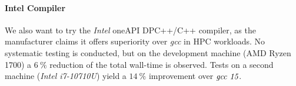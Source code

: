 	\paragraph{Intel Compiler}
		We also want to try the \emph{Intel\textsuperscript{\tiny\textregistered}} oneAPI DPC++/C++ compiler, as the manufacturer claims it offers superiority over \emph{gcc} in HPC workloads. No systematic testing is conducted, but on the development machine (AMD Ryzen 1700) a $\SI{6}{\percent}$ reduction of the total wall-time is observed. Tests on a second machine (\emph{Intel\textsuperscript{\tiny\textregistered} i7-10710U}) yield a $\SI{14}{\percent}$ improvement over $\emph{gcc 15}$.
			
	


	